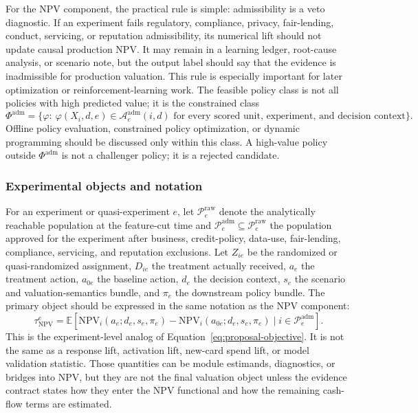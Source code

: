 \documentclass[11pt]{article}
\newcommand{\E}{\mathbb{E}}
\newcommand{\NPV}{\mathrm{NPV}}
\newcommand{\1}{\mathbf{1}}
\begin{document}
For the NPV component, the practical rule is simple: admissibility is a veto
diagnostic. If an experiment fails regulatory, compliance, privacy,
fair-lending, conduct, servicing, or reputation admissibility, its numerical
lift should not update causal production NPV. It may remain in a learning
ledger, root-cause analysis, or scenario note, but the output label should say
that the evidence is inadmissible for production valuation. This rule is
especially important for later optimization or reinforcement-learning work.
The feasible policy class is not all policies with high predicted value; it is
the constrained class
\begin{equation}
  \Phi^{\mathrm{adm}}
  =
  \{\varphi:\ \varphi(X_i,d,e)\in
    \mathcal{A}^{\mathrm{adm}}_e(i,d)
    \text{ for every scored unit, experiment, and decision context}\}.
  \label{eq:admissible-policy-class}
\end{equation}
Offline policy evaluation, constrained policy optimization, or dynamic
programming should be discussed only within this class. A high-value policy
outside $\Phi^{\mathrm{adm}}$ is not a challenger policy; it is a rejected
candidate.

\subsubsection{Experimental objects and notation}

For an experiment or quasi-experiment $e$, let
$\mathcal{P}^{\mathrm{raw}}_e$ denote the analytically reachable population at
the feature-cut time and $\mathcal{P}^{\mathrm{adm}}_e\subseteq
\mathcal{P}^{\mathrm{raw}}_e$ the population approved for the experiment after
business, credit-policy, data-use, fair-lending, compliance, servicing, and
reputation exclusions. Let $Z_{ie}$ be the randomized or quasi-randomized
assignment, $D_{ie}$ the treatment actually received, $a_e$ the treatment
action, $a_{0e}$ the baseline action, $d_e$ the decision context, $s_e$ the
scenario and valuation-semantics bundle, and $\pi_e$ the downstream policy
bundle. The primary object should be expressed in the same notation as the NPV
component:
\begin{equation}
  \tau^{e}_{\NPV}
  =
  \E\!\left[
    \NPV_i(a_e;d_e,s_e,\pi_e)
    -
    \NPV_i(a_{0e};d_e,s_e,\pi_e)
    \mid i\in\mathcal{P}^{\mathrm{adm}}_e
  \right].
  \label{eq:experiment-npv-estimand}
\end{equation}
This is the experiment-level analog of
Equation~\eqref{eq:proposal-objective}. It is not the same as a response lift,
activation lift, new-card spend lift, or model validation statistic. Those
quantities can be module estimands, diagnostics, or bridges into NPV, but they
are not the final valuation object unless the evidence contract states how
they enter the NPV functional and how the remaining cash-flow terms are
estimated.
\end{document}
